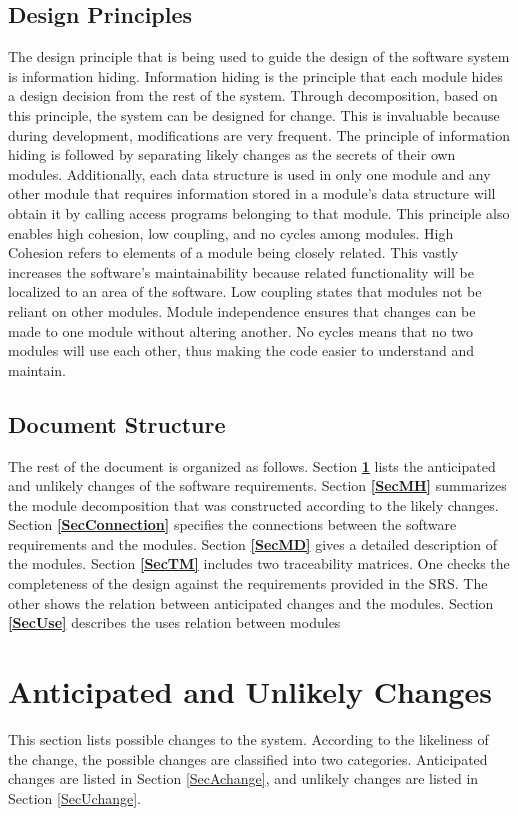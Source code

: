 \documentclass[12pt, titlepage]{article}
\begin{document}
\subsection{Design Principles}
The design principle that is being used to guide the design of the software system is information hiding. Information hiding is the principle that each module hides a design decision from the rest of the system. Through decomposition, based on this principle, the system can be designed for change. This is invaluable because during development, modifications are very frequent. The principle of information hiding is followed by separating likely changes as the secrets of their own modules. Additionally, each data structure is used in only one module and any other module that requires information stored in a module's data structure will obtain it by calling access programs belonging to that module. This principle also enables high cohesion, low coupling, and no cycles among modules. High Cohesion refers to elements of a module being closely related. This vastly increases the software's maintainability because related functionality will be localized to an area of the software. Low coupling states that modules not be reliant on other modules. Module independence ensures that changes can be made to one module without altering another. No cycles means that no two modules will use each other, thus making the code easier to understand and maintain. 

\subsection{Document Structure}
The rest of the document is organized as follows. Section
\textbf{\ref{SecChange}} lists the anticipated and unlikely changes of the software
requirements. Section \textbf{\ref{SecMH}} summarizes the module decomposition that
was constructed according to the likely changes. Section \textbf{\ref{SecConnection}}
specifies the connections between the software requirements and the
modules. Section \textbf{\ref{SecMD}} gives a detailed description of the
modules. Section \textbf{\ref{SecTM}} includes two traceability matrices. One checks
the completeness of the design against the requirements provided in the SRS. The
other shows the relation between anticipated changes and the modules. Section \textbf{\ref{SecUse}} describes the uses relation between modules

\section{Anticipated and Unlikely Changes} \label{SecChange}
This section lists possible changes to the system. According to the likeliness
of the change, the possible changes are classified into two
categories. Anticipated changes are listed in Section \ref{SecAchange}, and
unlikely changes are listed in Section \ref{SecUchange}.
\end{document}
